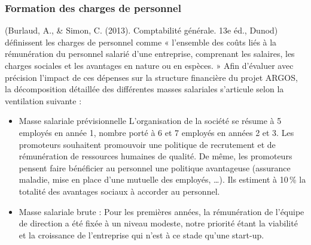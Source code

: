 \subsubsection{Formation des charges de personnel}
(Burlaud, A., \& Simon, C. (2013). Comptabilité générale. 13e éd., Dunod) définissent les charges de personnel comme « l'ensemble des coûts liés à la rémunération du personnel salarié d'une entreprise, comprenant les salaires, les charges sociales et les avantages en nature ou en espèces. » Afin d'évaluer avec précision l'impact de ces dépenses sur la structure financière du projet ARGOS, la décomposition détaillée des différentes masses salariales s'articule selon la ventilation suivante :
\begin{itemize}
    \item {Masse salariale prévisionnelle}
L'organisation de la société se résume à 5 employés en année 1, nombre porté à 6 et 7 employés en années 2 et 3. Les promoteurs souhaitent promouvoir une politique de recrutement et de rémunération de ressources humaines de qualité. De même, les promoteurs pensent faire bénéficier au personnel une politique avantageuse (assurance maladie, mise en place d'une mutuelle des employés, …). Ils estiment à 10\,\% la totalité des avantages sociaux à accorder au personnel.
    \item Masse salariale brute : 
    Pour les premières années, la rémunération de l'équipe de direction a été fixée à un niveau modeste, notre priorité étant la viabilité et la croissance de l'entreprise qui n'est à ce stade qu'une start-up.
\end{itemize}

